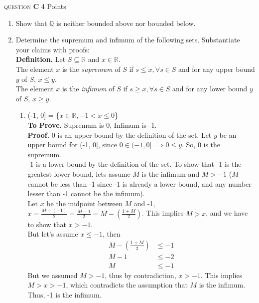 \documentclass[11pt]{article}
\newcommand{\problem
}[2]{
\begin{mdframed}
    \textsc{question} \textbf{#1} \hfill #2
\end{mdframed}
}
\begin{document}
\newpage
\problem{C}{4 Points}
\begin{enumerate}
	\item Show that $\mathbb{Q}$ is neither bounded above nor bounded below.
	\item Determine the supremum and infimum of the following sets. Substantiate your claims with proofs: \\
	      \textbf{Definition.} Let $S \subseteq \mathbb{R}$ and $x \in \mathbb{R}$.\\
	      The element $x$ is the \emph{supremum} of $S$ if $s \leq x, \forall s \in S$ and for any upper bound $y$ of $S$, $x \leq y$. \\The element $x$ is the \emph{infimum} of $S$ if $s \geq x, \forall s \in S$ and for any lower bound $y$ of $S$, $x \geq y$.

	      \begin{enumerate}
		      \item (-1, 0] = \{$x \in \mathbb{R}, -1 < x \leq 0$\}\\
		            \textbf{To Prove.} Supremum is 0, Infimum is -1.\\
		            \textbf{Proof.} 0 is an upper bound by the definition of the set. Let $y$ be an upper bound for (-1, 0], since $0 \in (-1, 0] \implies 0 \leq y$. So, 0 is the supremum.\\
		            -1 is a lower bound by the definition of the set. To show that -1 is the greatest lower bound, lets assume $M$ is the infimum and $M > -1$ ($M$ cannot be less than -1 since -1 is already a lower bound, and any number lesser than -1 cannot be the infimum).\\
		            Let $x$ be the midpoint between $M$ and -1, $x = \frac{M + (-1)}{2} = \frac{M - 1}{2} = M - (\frac{1+M}{2}).$ This implies $M > x$, and we have to show that $x > -1$.\\
		            But let's assume $x \leq -1$, then
		            \begin{align*}
			            M - (\frac{1+M}{2}) & \leq -1 \\
			            M - 1               & \leq -2 \\
			            M                   & \leq -1
		            \end{align*}
		            But we assumed $M > -1$, thus by contradiction, $x > -1$. This implies $M > x > -1$, which contradicts the assumption that $M$ is the infimum. Thus, -1 is the infimum.


\end{enumerate}
\end{enumerate}
\end{document}
